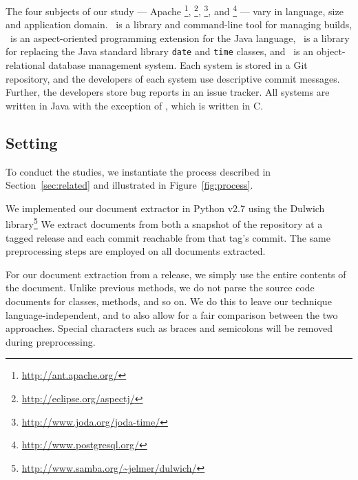 The four subjects of our study ---
Apache \ant\footnote{\url{http://ant.apache.org/}},
\aspectj\footnote{\url{http://eclipse.org/aspectj/}},
\jodatime\footnote{\url{http://www.joda.org/joda-time/}},
and \postgres\footnote{\url{http://www.postgresql.org/}}
--- vary in language, size and application domain.
\ant\ is a library and command-line tool for managing builds,
\aspectj\ is an aspect-oriented programming extension for the Java language,
\jodatime\ is a library for replacing the Java standard library \texttt{date} and \texttt{time} classes,
and \postgres\ is an object-relational database management system.
Each system is stored in a Git repository, and the developers of each system use descriptive commit messages.
Further, the developers store bug reports in an issue tracker.
All systems are written in Java with the exception of \postgres,
which is written in C.


\subsection{Setting}

To conduct the studies, we instantiate the process described in Section~\ref{sec:related} and illustrated in Figure~\ref{fig:process}.

We implemented our document extractor in Python v2.7
using the Dulwich library\footnote{\url{http://www.samba.org/~jelmer/dulwich/}} %
We extract documents from both a snapshot of the repository at a tagged
release and each commit reachable from that tag's commit.
The same preprocessing steps are employed on all documents extracted.

For our document extraction from a release,
we simply use the entire contents of the document.
Unlike previous methods, %
we do not parse the source code documents for classes, methods, and so on.
We do this to leave our technique language-independent,
and to also allow for a fair comparison between the two approaches.
Special characters such as braces and semicolons will be removed during
preprocessing.

